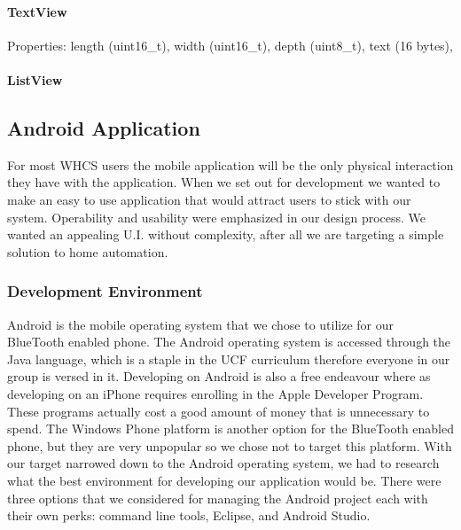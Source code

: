 \paragraph{TextView}
Properties: length (uint16\_t), width (uint16\_t), depth (uint8\_t), text (16
bytes),
\paragraph{ListView}


\subsection{Android Application} For most WHCS users the mobile application
will be the only physical interaction they have with the application. When we
set out for development we wanted to make an easy to use application that would
attract users to stick with our system.  Operability and usability were
emphasized in our design process. We wanted an appealing U.I. without
complexity, after all we are targeting a simple solution to home automation.

\subsubsection{Development Environment} Android is the mobile operating system
that we chose to utilize for our BlueTooth enabled phone. The Android operating
system is accessed through the Java language, which is a staple in the UCF
curriculum therefore everyone in our group is versed in it. Developing on
Android is also a free endeavour where as developing on an iPhone requires
enrolling in the Apple Developer Program. These programs actually cost a good
amount of money that is unnecessary to spend. The Windows Phone platform is
another option for the BlueTooth enabled phone, but they are very unpopular so
we chose not to target this platform. With our target narrowed down to the
Android operating system, we had to research what the best environment for
developing our application would be. There were three options that we
considered for managing the Android project each with their own perks: command
line tools, Eclipse, and Android Studio.

